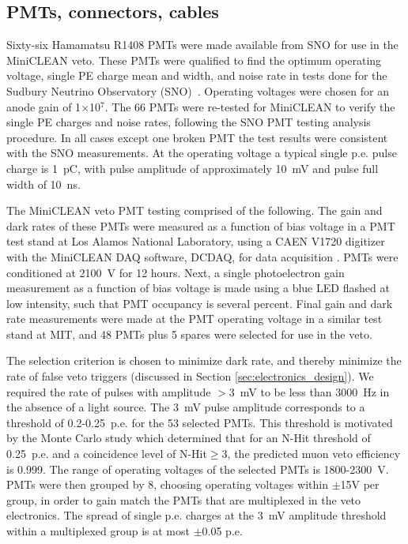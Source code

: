 \documentclass[review,number,sort&compress]{elsarticle}
\begin{document}
\subsection{PMTs, connectors, cables}
\label{sec:pmts}
%
Sixty-six Hamamatsu R1408 PMTs were made available from SNO for use in the
MiniCLEAN veto. These PMTs were qualified to find the optimum
operating voltage, single PE charge mean and width, and noise rate in
tests done for the Sudbury Neutrino Observatory
(SNO)~\cite{ref:sno_pmt_paper}.  Operating voltages were chosen for an
anode gain of 1$\times$10$^7$.  The 66 PMTs were re-tested for
MiniCLEAN to verify the single PE charges and noise rates, following
the SNO PMT testing analysis procedure.  In all cases except one
broken PMT the test results were consistent with the SNO measurements.
At the operating voltage a typical single p.e. pulse charge is 1~pC,
with pulse amplitude of approximately 10~mV and pulse full width of
10~ns.

The MiniCLEAN veto PMT testing comprised of the following.  The gain and
dark rates of these PMTs were measured as a function of bias voltage
in a PMT test stand at Los Alamos National Laboratory, using a CAEN
V1720 digitizer with the MiniCLEAN DAQ software, DCDAQ, for data
acquisition \cite{ref:gastler_thesis}. PMTs were conditioned at 2100~V
for 12 hours. Next, a single photoelectron gain measurement as a
function of bias voltage is made using a blue LED flashed at low
intensity, such that PMT occupancy is several percent. Final gain and
dark rate measurements were made at the PMT operating voltage in a
similar test stand at MIT, and 48 PMTs plus 5 spares were selected for
use in the veto. 

The selection criterion is chosen to minimize dark rate, and thereby
minimize the rate of false veto triggers (discussed in Section
\ref{sec:electronics_design}).  We required the rate of pulses with
amplitude $>$3~mV to be less than 3000~Hz in the absence of a light
source.  The 3~mV pulse amplitude corresponds to a threshold of
0.2-0.25~p.e. for the 53 selected PMTs.  This threshold is motivated
by the Monte Carlo study which determined that for an N-Hit threshold
of 0.25~p.e. and a coincidence level of N-Hit$\ge$3, the predicted
muon veto efficiency is 0.999.  The range of operating voltages of the
selected PMTs is 1800-2300~V.  PMTs were then grouped by 8, choosing
operating voltages within $\pm$15V per group, in order to gain match
the PMTs that are multiplexed in the veto electronics.  The spread of
single p.e. charges at the 3~mV amplitude threshold within a
multiplexed group is at most $\pm$0.05 p.e.
\end{document}
